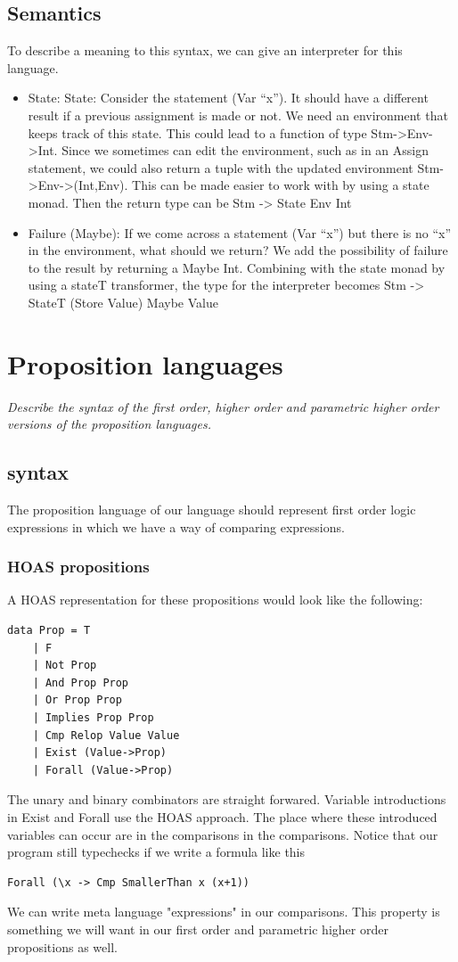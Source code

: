 \subsection{Semantics}
To describe a meaning to this syntax, we can give an interpreter for this language.

\begin{itemize}
    \item State: State: Consider the statement (Var “x”). It should have a different result if a previous assignment is made or not. We need an environment that keeps track of this state. This could lead to a function of type Stm->Env->Int. Since we sometimes can edit the environment, such as in an Assign statement, we could also return a tuple with the updated environment Stm->Env->(Int,Env). This can be made easier to work with by using a state monad. Then the return type can be Stm -> State Env Int
    \item Failure (Maybe): If we come across a statement (Var “x”) but there is no “x” in the environment, what should we return? We add the possibility of failure to the result by returning a Maybe Int. Combining with the state monad by using a stateT transformer, the type for the interpreter becomes  Stm -> StateT (Store Value) Maybe Value
\end{itemize}

\section{Proposition languages}
\textit{Describe the syntax of the first order, higher order and parametric higher order versions of the proposition languages. }
\subsection{syntax}
The proposition language of our language should represent first order logic expressions in which we have a way of comparing expressions.

\subsubsection{HOAS propositions}
A HOAS representation for these propositions would look like the following:

\begin{verbatim}
data Prop = T 
    | F 
    | Not Prop
    | And Prop Prop 
    | Or Prop Prop 
    | Implies Prop Prop
    | Cmp Relop Value Value 
    | Exist (Value->Prop) 
    | Forall (Value->Prop)
\end{verbatim}
The unary and binary combinators are straight forwared. Variable introductions in Exist and Forall use the HOAS approach. The place where these introduced variables can occur are in the comparisons in the comparisons. Notice that our program still typechecks if we write a formula like this
\begin{verbatim}
Forall (\x -> Cmp SmallerThan x (x+1))  
\end{verbatim}
We can write meta language "expressions" in our comparisons. This property is something we will want in our first order and parametric higher order propositions as well. 

